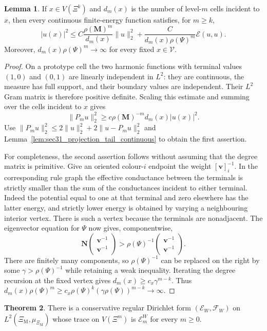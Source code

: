 \documentclass{article}
\theoremstyle{plain}
\theoremstyle{definition}
\newtheorem{theorem}{Theorem}[section]
\newtheorem{lemma}[theorem]{Lemma}
\begin{document}
\begingroup\color{red}
\begin{lemma}\label{lem:sec31_point_evaluation}
If $x\in V(\Xi^k)$ and $d_m(x)$ is the number of level-$m$ cells incident to
$x$, then every continuous finite-energy function satisfies, for $m\ge k$,
\[
|u(x)|^2\le C\frac{\rho(\mathbf M)^m}{d_m(x)}\|u\|_2^2
       +\frac{C}{d_m(x)\rho(\Psi)^m}\mathcal E(u,u).
\]
Moreover, $d_m(x)\rho(\Psi)^m\to\infty$ for every fixed $x\in\mathscr V$.
\end{lemma}
\begin{proof}
On a prototype cell the two harmonic functions with terminal values $(1,0)$
and $(0,1)$ are linearly independent in $L^2$: they are continuous, the
measure has full support, and their boundary values are independent.
Their $L^2$ Gram matrix is therefore positive definite. Scaling this estimate
and summing over the cells incident to $x$ gives
\[
\|P_m u\|_2^2\ge c\rho(\mathbf M)^{-m}d_m(x)|u(x)|^2.
\]
Use $\|P_m u\|_2^2\le2\|u\|_2^2+2\|u-P_m u\|_2^2$ and
Lemma~\ref{lem:sec31_projection_tail_continuous} to obtain the first assertion.

For completeness, the second assertion follows without assuming that the
degree matrix is primitive. Give an oriented colour-$i$ endpoint the weight
$[\mathbf v]_i^{-1}$. In the corresponding rule graph the effective
conductance between the terminals is strictly smaller than the sum of the
conductances incident to either terminal. Indeed the potential equal to one
at that terminal and zero elsewhere has the latter energy, and strictly
lower energy is obtained by varying a neighbouring interior vertex.
There is such a vertex because the terminals are nonadjacent.
The eigenvector equation for $\Psi$ now gives, componentwise,
\[
\mathbf N
\begin{pmatrix}\mathbf v^{-1}\\\mathbf v^{-1}\end{pmatrix}
>
\rho(\Psi)^{-1}
\begin{pmatrix}\mathbf v^{-1}\\\mathbf v^{-1}\end{pmatrix}.
\]
There are finitely many components, so $\rho(\Psi)^{-1}$ can be replaced
on the right by some $\gamma>\rho(\Psi)^{-1}$ while retaining a weak
inequality. Iterating the degree recursion at the fixed vertex gives
$d_m(x)\ge c_x\gamma^{m-k}$. Thus
$d_m(x)\rho(\Psi)^m\ge c_x\rho(\Psi)^k(\gamma\rho(\Psi))^{m-k}
\to\infty$.
\end{proof}
\endgroup{}

\begin{theorem}\label{thm:sec31_limit_dirichlet_form}
There is a conservative regular Dirichlet form $(\mathcal E_W,\mathcal F_W)$ on $L^2(\Xi_{\mathrm M},\mu_{\Xi_{\mathrm M}})$ whose trace on $V(\Xi^m)$ is $\mathcal E_m^W$ for every $m\ge 0$.
\end{theorem}
\end{document}
